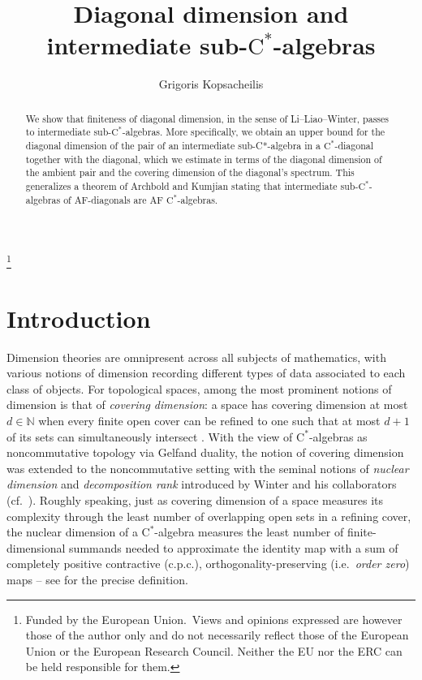 \documentclass[11pt,a4paper]{amsart}
\title{Diagonal dimension and intermediate sub-\texorpdfstring{$\mathrm{C}^\ast$}{C*}-algebras}
\author{Grigoris Kopsacheilis}
\theoremstyle{definition}
\numberwithin{equation}{section}
\newcommand\blfootnote[1]{%
  \begingroup
  \renewcommand\thefootnote{}\footnote{#1}%
  \addtocounter{footnote}{-1}%
  \endgroup
}
\begin{document}
\begin{abstract}

We show that finiteness of diagonal dimension, in the sense of Li--Liao--Winter, passes to intermediate sub-$\mathrm{C}^\ast$-algebras. More specifically, we obtain an upper bound for the diagonal dimension of the pair of an intermediate sub-C*-algebra in a $\mathrm{C}^\ast$-diagonal together with the diagonal, which we estimate in terms of the diagonal dimension of the ambient pair and the covering dimension of the diagonal's spectrum. This generalizes a theorem of Archbold and Kumjian stating that intermediate sub-$\mathrm{C}^\ast$-algebras of AF-diagonals are AF $\mathrm{C}^\ast$-algebras.
\end{abstract}
\maketitle



\blfootnote{\noindent Funded by the European Union.\ Views and opinions expressed are however those of the author only and do not necessarily reflect those of the European Union or the European Research Council. Neither the EU nor the ERC can be held responsible for them.}

\section*{Introduction}


\noindent Dimension theories are omnipresent across all subjects of mathematics, with various notions of dimension recording different types of data associated to each class of objects. For topological spaces, among the most prominent notions of dimension is that of \emph{covering dimension}: a space has covering dimension at most $d\in\mathbb{N}$ when every finite open cover can be refined to one such that at most $d+1$ of its sets can simultaneously intersect \cite{Engelking78}. With the view of $\mathrm{C}^\ast$-algebras as noncommutative topology via Gelfand duality, the notion of covering dimension was extended to the noncommutative setting with the seminal notions of \emph{nuclear dimension} and \emph{decomposition rank} introduced by Winter and his collaborators \cite{KirWin04, WinZac10} (cf.\ \cite{Win02}). Roughly speaking, just as covering dimension of a space measures its complexity through the least number of overlapping open sets in a refining cover, the nuclear dimension of a $\mathrm{C}^\ast$-algebra measures the least number of finite-dimensional summands needed to approximate the identity map with a sum of completely positive contractive (c.p.c.), orthogonality-preserving (i.e.\ \emph{order zero}) maps -- see \cite[Definition~1.5]{Win18} for the precise definition.
\end{document}
